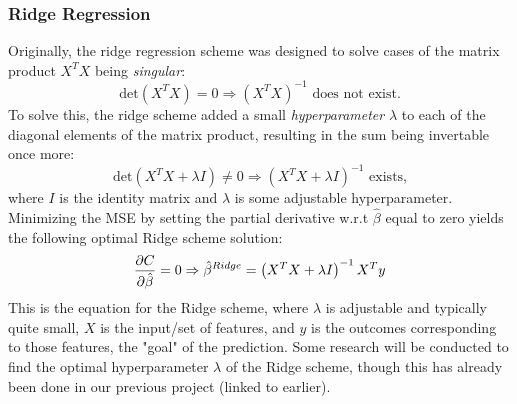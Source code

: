         \subsubsection{Ridge Regression}
            Originally, the ridge regression scheme was designed to solve cases of the matrix product $X^TX$ being \textit{singular}:
            \begin{equation}
                \text{det} \left(X^TX \right) = 0 \Rightarrow \left( X^TX \right)^{-1} \text{ does not exist.}
            \end{equation}
            To solve this, the ridge scheme added a small \textit{hyperparameter} $\lambda$ to each of the diagonal elements of the matrix product, resulting in the sum being invertable once more:
            \begin{equation}
                \text{det} \left(X^TX +\lambda I \right) \neq 0 \Rightarrow \left(X^TX +\lambda I \right)^{-1} \text{ exists,}
            \end{equation}
            where $I$ is the identity matrix and $\lambda$ is some adjustable hyperparameter. Minimizing the MSE by setting the partial derivative w.r.t $\hat{\beta}$ equal to zero yields the following optimal Ridge scheme solution:
            \begin{equation}
                \pdv{C}{\hat{\beta}}=0\Rightarrow \hat{\beta}^{Ridge} = \left( X^TX + \lambda I \right)^{-1}X^Ty
            \end{equation}
            This is the equation for the Ridge scheme, where $\lambda$ is adjustable and typically quite small, $X$ is the input/set of features, and $y$ is the outcomes corresponding to those features, the "goal" of the prediction.
            Some research will be conducted to find the optimal hyperparameter $\lambda$ of the Ridge scheme, though this has already been done in our previous project (linked to earlier).
            
